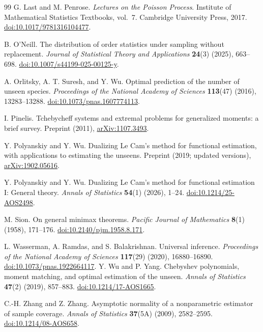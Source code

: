 \documentclass[11pt]{article}
\numberwithin{equation}{section}
\theoremstyle{definition}
\theoremstyle{remark}
\begin{document}
\begin{thebibliography}{99}
G. Last and M. Penrose.
\emph{Lectures on the Poisson Process}.
Institute of Mathematical Statistics Textbooks, vol.~7. Cambridge University Press, 2017.
\href{https://doi.org/10.1017/9781316104477}{doi:10.1017/9781316104477}.

B. O'Neill.
The distribution of order statistics under sampling without replacement.
\emph{Journal of Statistical Theory and Applications} \textbf{24}(3) (2025), 663--698.
\href{https://doi.org/10.1007/s44199-025-00125-y}{doi:10.1007/s44199-025-00125-y}.

A. Orlitsky, A. T. Suresh, and Y. Wu.
Optimal prediction of the number of unseen species.
\emph{Proceedings of the National Academy of Sciences} \textbf{113}(47) (2016), 13283--13288.
\href{https://doi.org/10.1073/pnas.1607774113}{doi:10.1073/pnas.1607774113}.

I. Pinelis.
Tchebycheff systems and extremal problems for generalized moments: a brief survey.
Preprint (2011), \href{https://arxiv.org/abs/1107.3493}{arXiv:1107.3493}.

Y. Polyanskiy and Y. Wu.
Dualizing Le Cam's method for functional estimation, with applications to estimating the unseens.
Preprint (2019; updated versions), \href{https://arxiv.org/abs/1902.05616}{arXiv:1902.05616}.

Y. Polyanskiy and Y. Wu.
Dualizing Le Cam's method for functional estimation I: General theory.
\emph{Annals of Statistics} \textbf{54}(1) (2026), 1--24.
\href{https://doi.org/10.1214/25-AOS2498}{doi:10.1214/25-AOS2498}.

M. Sion.
On general minimax theorems.
\emph{Pacific Journal of Mathematics} \textbf{8}(1) (1958), 171--176.
\href{https://doi.org/10.2140/pjm.1958.8.171}{doi:10.2140/pjm.1958.8.171}.

L. Wasserman, A. Ramdas, and S. Balakrishnan.
Universal inference.
\emph{Proceedings of the National Academy of Sciences} \textbf{117}(29) (2020), 16880--16890.
\href{https://doi.org/10.1073/pnas.1922664117}{doi:10.1073/pnas.1922664117}.
Y. Wu and P. Yang.
Chebyshev polynomials, moment matching, and optimal estimation of the unseen.
\emph{Annals of Statistics} \textbf{47}(2) (2019), 857--883.
\href{https://doi.org/10.1214/17-AOS1665}{doi:10.1214/17-AOS1665}.

C.-H. Zhang and Z. Zhang.
Asymptotic normality of a nonparametric estimator of sample coverage.
\emph{Annals of Statistics} \textbf{37}(5A) (2009), 2582--2595.
\href{https://doi.org/10.1214/08-AOS658}{doi:10.1214/08-AOS658}.
\end{thebibliography}
\endgroup
\end{document}
